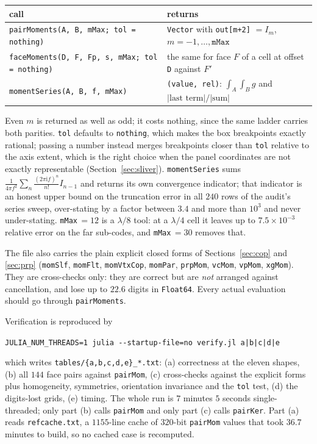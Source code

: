 \documentclass[11pt]{article}
\theoremstyle{remark}
\newcommand{\ii}{\mathrm{i}}
\newcommand{\code}[1]{\texttt{#1}}
\begin{document}
\begin{center}\small
\begin{tabular}{@{}ll@{}}
\toprule
call & returns \\
\midrule
\code{pairMoments(A, B, mMax; tol = nothing)} & \code{Vector} with \code{out[m+2]} $= I_m$, $m = -1,\ldots,\code{mMax}$ \\
\code{faceMoments(D, F, Fp, s, mMax; tol = nothing)} & the same for face $F$ of a cell at offset \code{D} against $F'$ \\
\code{momentSeries(A, B, f, mMax)} & \code{(value, rel)}: $\int_A\int_B g$ and $|\text{last term}|/|\text{sum}|$ \\
\bottomrule
\end{tabular}
\end{center}

\noindent
Even $m$ is returned as well as odd; it costs nothing, since the same ladder carries both
parities. \code{tol} defaults to \code{nothing}, which makes the box breakpoints exactly
rational; passing a number instead merges breakpoints closer than \code{tol} relative to
the axis extent, which is the right choice when the panel coordinates are not exactly
representable (Section~\ref{sec:sliver}). \code{momentSeries} sums
$\frac{1}{4\pi f^2}\sum_n \frac{(2\pi\ii f)^n}{n!} I_{n-1}$ and returns its own
convergence indicator; that indicator is an honest upper bound on the truncation error in
all $240$ rows of the audit's series sweep, over-stating by a factor between $3.4$ and
more than $10^{3}$ and never under-stating. \code{mMax}$\,=12$ is a $\lambda/8$ tool: at a
$\lambda/4$ cell it leaves up to $7.5\times10^{-3}$ relative error on the far sub-codes,
and \code{mMax}$\,=30$ removes that.

The file also carries the plain explicit closed forms of Sections~\ref{sec:cop} and
\ref{sec:prp} (\code{momSlf}, \code{momFlt}, \code{momVtxCop}, \code{momPar},
\code{prpMom}, \code{vcMom}, \code{vpMom}, \code{xgMom}). They are cross-checks only: they
are correct but are \emph{not} arranged against cancellation, and lose up to $22.6$ digits
in \code{Float64}. Every actual evaluation should go through \code{pairMoments}.

Verification is reproduced by
\begin{center}\small
\code{JULIA\_NUM\_THREADS=1 julia -{}-startup-file=no verify.jl a|b|c|d|e}
\end{center}
which writes \code{tables/\{a,b,c,d,e\}\_*.txt}: (a) correctness at the eleven shapes,
(b) all $144$ face pairs against \code{pairMom}, (c) cross-checks against the explicit
forms plus homogeneity, symmetries, orientation invariance and the \code{tol} test,
(d) the digits-lost grids, (e) timing. The whole run is $7$ minutes $5$ seconds
single-threaded; only part (b) calls \code{pairMom} and only part (c) calls
\code{pairKer}. Part (a) reads \code{refcache.txt}, a $1155$-line cache of $320$-bit
\code{pairMom} values that took $36.7$ minutes to build, so no cached case is recomputed.
\end{document}
